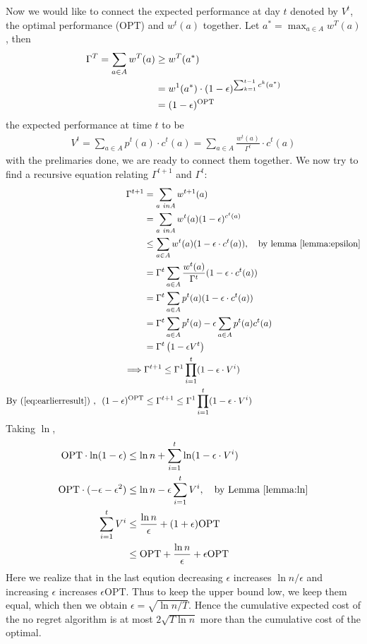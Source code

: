 Now we would like to connect the expected performance at day $t$ denoted by $V^t$, the optimal performance (OPT) and $w^t(a)$ together. Let $a^\ast = \max_{a \in A}w^T(a)$, then
\begin{align}
\Gamma^T=\sum_{a \in A} w^T(a) &\geq w^T(a^\ast)\notag\\
&= w^1(a^\ast)\cdot (1-\epsilon)^{\sum_{k=1}^{t-1}c^k(a^\ast)}\notag\\
&=  (1-\epsilon)^{\text{OPT}}\label{eq:earlierresult}
\end{align}
the expected performance at time $t$ to be
\begin{align*}
V^t=\sum_{a\in A}p^t(a)\cdot c^t(a)=\sum_{a \in A}\frac{w^t(a)}{\Gamma^t}\cdot c^t(a)
\end{align*}
with the prelimaries done, we are ready to connect them together. We now try to find a recursive equation relating $\Gamma^{t+1}$ and $\Gamma^t$:
\begin{align*}
\Gamma^{t+1}&=\sum_{a\ in A} w^{t+1}(a)\\
&=\sum_{a\ in A} w^{t}(a)(1-\epsilon)^{c^t(a)}\\
&\leq \sum_{a\in A} w^{t}(a)(1-\epsilon\cdot c^t(a)), \quad \text{by lemma \ref{lemma:epsilon}}\\
&= \Gamma^t\sum_{a\in A} \frac{w^{t}(a)}{\Gamma^t}(1-\epsilon\cdot c^t(a))\\
&= \Gamma^t\sum_{a\in A} p^{t}(a)(1-\epsilon\cdot c^t(a))\\
&= \Gamma^t\sum_{a\in A} p^{t}(a)-\epsilon\sum_{a\in A}p^t(a) c^t(a)\\
&= \Gamma^t\left(1-\epsilon V^t\right)\\
\implies& \Gamma^{t+1} \leq \Gamma^1 \prod_{i=1}^{t}(1-\epsilon\cdot V^i)\\
\text{By (\ref{eq:earlierresult})	,}~~(1-\epsilon)^{\text{OPT}}&\leq\Gamma^{t+1} \leq \Gamma^1 \prod_{i=1}^{t}(1-\epsilon\cdot V^i)
\end{align*}
Taking $\ln$,
\begin{align*}
\text{OPT}\cdot \ln(1-\epsilon)&\leq \ln n + \sum_{i=1}^{t} \ln (1-\epsilon \cdot V^i)\\
\text{OPT}\cdot (-\epsilon-\epsilon^2)&\leq \ln n - \epsilon\sum_{i=1}^{t}  V^i, \quad \text{by Lemma \ref{lemma:ln}}\\
\sum_{i=1}^{t}  V^i &\leq \frac{\ln n}{\epsilon}+(1+\epsilon)\text{OPT}\\
&\leq \text{OPT}+\frac{\ln n}{\epsilon}+\epsilon\text{OPT}
\end{align*}
Here we realize that in the last eqution decreasing $\epsilon$ increases $\ln n /\epsilon$ and increasing $\epsilon$ increases $\epsilon \text{OPT}$. Thus to keep the upper bound low, we keep them equal, which then we obtain $\epsilon = \sqrt{\ln n /T}$. Hence the cumulative expected cost of the no regret algorithm is at most $2\sqrt{T\ln n}$ more than the cumulative cost of the optimal.

